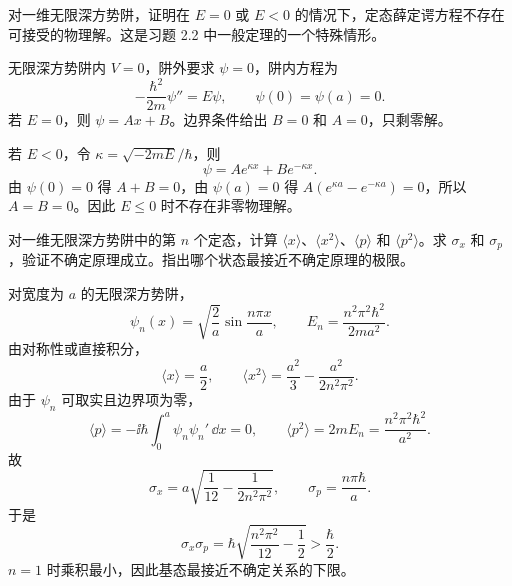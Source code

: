 \begin{question}
对一维无限深方势阱，证明在 $E=0$ 或 $E<0$ 的情况下，定态薛定谔方程不存在可接受的物理解。这是习题 2.2 中一般定理的一个特殊情形。
\end{question}
\begin{solution}
无限深方势阱内 $V=0$，阱外要求 $\psi=0$，阱内方程为
\[
-\frac{\hbar^2}{2m}\psi''=E\psi,
\qquad \psi(0)=\psi(a)=0.
\]
若 $E=0$，则 $\psi=Ax+B$。边界条件给出 $B=0$ 和 $A=0$，只剩零解。

若 $E<0$，令 $\kappa=\sqrt{-2mE}/\hbar$，则
\[
\psi=Ae^{\kappa x}+Be^{-\kappa x}.
\]
由 $\psi(0)=0$ 得 $A+B=0$，由 $\psi(a)=0$ 得 $A(e^{\kappa a}-e^{-\kappa a})=0$，所以 $A=B=0$。因此 $E\le0$ 时不存在非零物理解。
\end{solution}

\begin{question}
对一维无限深方势阱中的第 $n$ 个定态，计算 $\langle x\rangle$、$\langle x^2\rangle$、$\langle p\rangle$ 和 $\langle p^2\rangle$。求 $\sigma_x$ 和 $\sigma_p$，验证不确定原理成立。指出哪个状态最接近不确定原理的极限。
\end{question}
\begin{solution}
对宽度为 $a$ 的无限深方势阱，
\[
\psi_n(x)=\sqrt{\frac2a}\sin\frac{n\pi x}{a},\qquad
E_n=\frac{n^2\pi^2\hbar^2}{2ma^2}.
\]
由对称性或直接积分，
\[
\langle x\rangle=\frac a2,
\qquad
\langle x^2\rangle=\frac{a^2}{3}-\frac{a^2}{2n^2\pi^2}.
\]
由于 $\psi_n$ 可取实且边界项为零，
\[
\langle p\rangle=-\ii\hbar\int_0^a\psi_n\psi_n'\,\dd x=0,
\qquad
\langle p^2\rangle=2mE_n=\frac{n^2\pi^2\hbar^2}{a^2}.
\]
故
\[
\sigma_x=a\sqrt{\frac1{12}-\frac1{2n^2\pi^2}},
\qquad
\sigma_p=\frac{n\pi\hbar}{a}.
\]
于是
\[
\sigma_x\sigma_p
=\hbar\sqrt{\frac{n^2\pi^2}{12}-\frac12}>\frac{\hbar}{2}.
\]
$n=1$ 时乘积最小，因此基态最接近不确定关系的下限。
\end{solution}

